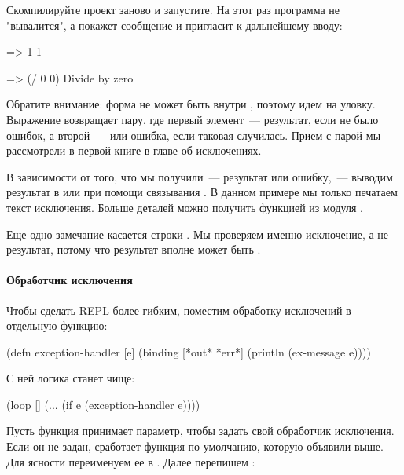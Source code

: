 Скомпилируйте проект заново и запустите. На этот раз программа не "вывалится", а покажет сообщение и пригласит к дальнейшему вводу:

\begin{english}
  \begin{clojure}
=> 1
1

=> (/ 0 0)
Divide by zero
  \end{clojure}
\end{english}

Обратите внимание: форма  не может быть внутри , поэтому идем на уловку. Выражение  возвращает пару, где первый элемент~--- результат, если не было ошибок, а второй~---  или ошибка, если таковая случилась. Прием с парой мы рассмотрели в первой книге в главе об исключениях.

В зависимости от того, что мы получили~--- результат или ошибку,~--- выводим результат в  или  при помощи связывания . В данном примере мы только печатаем текст исключения. Больше деталей можно получить функцией  из модуля .

Еще одно замечание касается строки . Мы проверяем именно исключение, а не результат, потому что результат вполне может быть .

\paragraph{Обработчик исключения}

Чтобы сделать REPL более гибким, поместим обработку исключений в отдельную функцию:

\begin{english}
  \begin{clojure}
(defn exception-handler [e]
  (binding [*out* *err*]
    (println (ex-message e))))
  \end{clojure}
\end{english}

С ней логика  станет чище:

\begin{english}
  \begin{clojure}
(loop []
  (...
   (if e
     (exception-handler e))))
  \end{clojure}
\end{english}

Пусть функция  принимает параметр, чтобы задать свой обработчик исключения. Если он не задан, сработает функция по умолчанию, которую объявили выше. Для ясности переименуем ее в . Далее перепишем :

